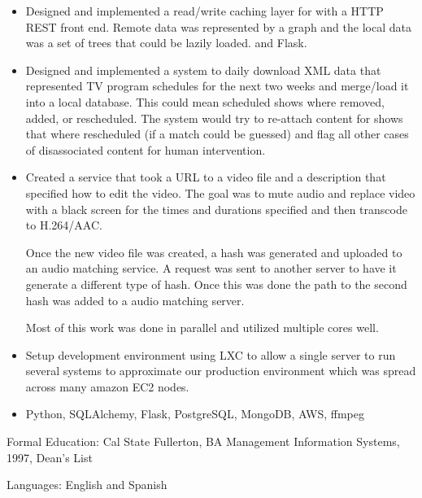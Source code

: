 \documentclass{res}
\begin{document}
\begin{resume}
  \begin{itemize}

  \item
    Designed and implemented a read/write caching layer for with a
    HTTP REST front end.
    Remote data was represented by a graph and the
    local data was a set of trees that could be lazily loaded. 
    and Flask.

  \item
    Designed and implemented a system to daily download XML data
    that represented TV program schedules for the next two weeks and
    merge/load it into a local database.  This could mean scheduled
    shows where removed, added, or rescheduled.  The system would try
    to re-attach content for shows that where rescheduled (if a match
    could be guessed) and flag all other cases of disassociated content
    for human intervention.

  \item
    Created a service that took a URL to a video file and a description
    that specified how to edit the video.  The goal was to mute audio
    and replace video with a black screen for the times and durations
    specified and then transcode to H.264/AAC.

    Once the new video file was created, a hash was generated and uploaded
    to an audio matching service. A request was sent to another server
    to have it generate a different type of hash.  Once this was done
    the path to the second hash was added to a audio matching server.

    Most of this work was done in parallel and utilized multiple cores
    well.

  \item
    Setup development environment using LXC to allow a single server to
    run several systems to approximate our production environment which
    was spread across many amazon EC2 nodes.

  \item
    Python, SQLAlchemy, Flask, PostgreSQL, MongoDB, AWS, ffmpeg

  \end{itemize}

  Formal Education: Cal State Fullerton, BA Management Information
  Systems, 1997, Dean's List

  Languages: English and Spanish

\end{resume}
\end{document}
